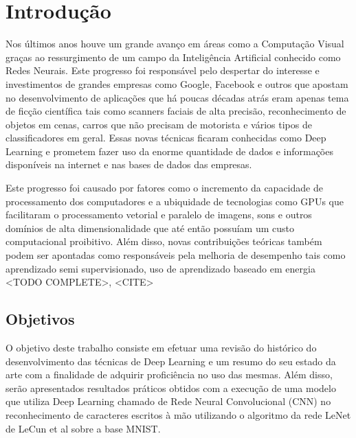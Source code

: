 \chapter{Introdução}

Nos últimos anos houve um grande avanço em áreas como a Computação
Visual graças ao ressurgimento de um campo da Inteligência Artificial conhecido
como Redes Neurais. Este progresso foi responsável pelo despertar do interesse
e investimentos de grandes empresas como Google, Facebook e outros que apostam
no desenvolvimento de aplicações que há poucas décadas atrás eram apenas tema
de ficção científica tais como scanners faciais de alta precisão,
reconhecimento de objetos em cenas, carros que não precisam de motorista e
vários tipos de classificadores em geral. Essas novas técnicas ficaram
conhecidas como Deep Learning e prometem fazer uso da enorme quantidade de
dados e informações disponíveis na internet e nas bases de dados das empresas.

Este progresso foi causado por fatores como o incremento da capacidade de
processamento dos computadores e a ubiquidade de tecnologias como GPUs que
facilitaram o processamento vetorial e paralelo de imagens, sons e outros
domínios de alta dimensionalidade que até então possuíam um custo computacional
proibitivo. Além disso, novas contribuições teóricas também podem ser apontadas
como responsáveis pela melhoria de desempenho tais como aprendizado semi
supervisionado, uso de aprendizado baseado em energia <TODO COMPLETE>, <CITE>

\section{Objetivos}

O objetivo deste trabalho consiste em efetuar uma revisão do
histórico do desenvolvimento das técnicas de Deep Learning e um resumo do seu
estado da arte com a finalidade de adquirir proficiência no uso das mesmas.
Além disso, serão apresentados resultados práticos obtidos com a execução de
uma modelo que utiliza Deep Learning chamado de Rede Neural Convolucional
(CNN) no reconhecimento de caracteres escritos à mão utilizando o algoritmo da
rede LeNet de LeCun et al sobre a base MNIST.\@


